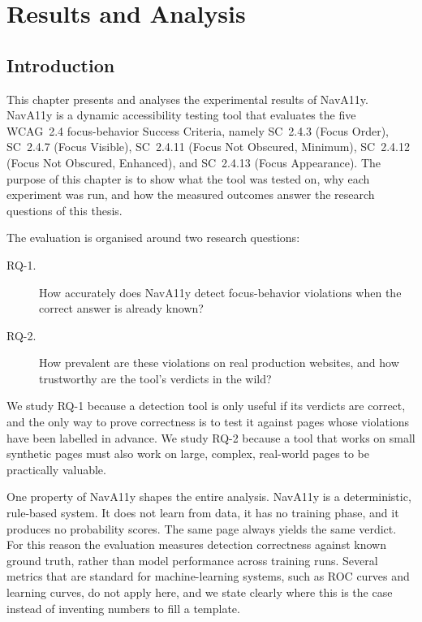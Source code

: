 
\chapter{Results and Analysis}
\label{ch:results}

\section{Introduction}
\label{sec:res-intro}

This chapter presents and analyses the experimental results of NavA11y. NavA11y is a
dynamic accessibility testing tool that evaluates the five WCAG~2.4 focus-behavior Success
Criteria, namely SC~2.4.3 (Focus Order), SC~2.4.7 (Focus Visible), SC~2.4.11 (Focus Not
Obscured, Minimum), SC~2.4.12 (Focus Not Obscured, Enhanced), and SC~2.4.13 (Focus
Appearance). The purpose of this chapter is to show what the tool was tested on, why each
experiment was run, and how the measured outcomes answer the research questions of this
thesis.

The evaluation is organised around two research questions:

\begin{description}
  \item[RQ-1.] How accurately does NavA11y detect focus-behavior violations when the
    correct answer is already known?
  \item[RQ-2.] How prevalent are these violations on real production websites, and how
    trustworthy are the tool's verdicts in the wild?
\end{description}

We study RQ-1 because a detection tool is only useful if its verdicts are correct, and the
only way to prove correctness is to test it against pages whose violations have been
labelled in advance. We study RQ-2 because a tool that works on small synthetic pages must
also work on large, complex, real-world pages to be practically valuable.

One property of NavA11y shapes the entire analysis. NavA11y is a deterministic, rule-based
system. It does not learn from data, it has no training phase, and it produces no
probability scores. The same page always yields the same verdict. For this reason the
evaluation measures detection correctness against known ground truth, rather than model
performance across training runs. Several metrics that are standard for machine-learning
systems, such as ROC curves and learning curves, do not apply here, and we state clearly
where this is the case instead of inventing numbers to fill a template.

